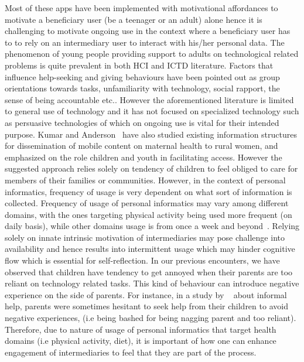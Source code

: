 \documentclass{sig-alternate}
\begin{document}
Most of these apps have been implemented with motivational affordances to motivate a beneficiary user (be a teenager or an adult) alone hence it is challenging to motivate ongoing use in the context where a beneficiary user has to to rely on an intermediary user to interact with his/her personal data. The phenomenon of young people providing support to adults on technological related problems is quite prevalent in both HCI and ICTD literature. Factors that influence help-seeking and giving behaviours have been pointed out as group orientations towards tasks, unfamiliarity with technology, social rapport, the sense of being accountable etc.\cite{sambasivan2010,poole:chh,kiesler:twi,parikh2006}. However the aforementioned literature is limited to general use of technology and it has not focused on specialized technology such as persuasive technologies of which on ongoing use is vital for their intended purpose. Kumar and Anderson~\cite{kumar2015mobile} have also studied existing information structures for dissemination of mobile content on maternal health to rural women, and emphasized on the role children and youth in facilitating access. However the suggested approach relies solely on tendency of children to feel obliged to care for members of their families or communities. However, in the context of personal informatics, frequency of usage is very dependent on what sort of information is collected. Frequency of usage of personal informatics may vary among different domains, with the ones targeting physical activity being used more frequent (on daily basis), while other domains usage is from once a week and beyond~\cite{epstein2015lived}. Relying solely on innate intrinsic motivation of intermediaries may pose challenge into availability and hence results into intermittent usage which may hinder cognitive flow which is essential for self-reflection. In our previous encounters, we have observed that children have tendency to get annoyed when their parents are too reliant on technology related tasks. This kind of behaviour can introduce negative experience on the side of parents. For instance, in a study by ~\cite{kiesler:twi} about informal help, parents were sometimes hesitant to seek help from their children to avoid negative experiences, (i.e being bashed for being nagging parent and too reliant). Therefore, due to nature of usage of personal informatics that target health domains (i.e physical activity, diet), it is important of how one can enhance engagement of intermediaries to feel that they are part of the process.
\end{document}
